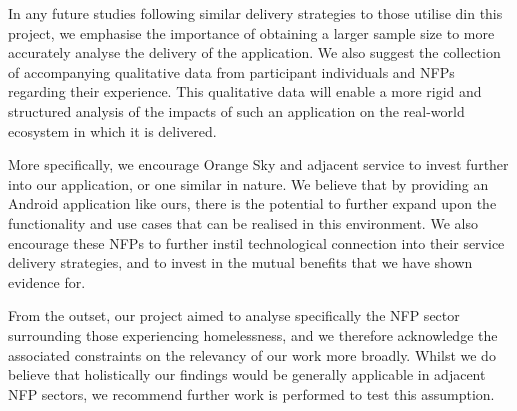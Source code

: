 In any future studies following similar delivery strategies to those utilise din this project, we emphasise the importance of obtaining a larger sample size to more accurately analyse the delivery of the application. We also suggest the collection of accompanying qualitative data from participant individuals and NFPs regarding their experience. This qualitative data will enable a more rigid and structured analysis of the impacts of such an application on the real-world ecosystem in which it is delivered.

More specifically, we encourage Orange Sky and adjacent service to invest further into our application, or one similar in nature. We believe that by providing an Android application like ours, there is the potential to further expand upon the functionality and use cases that can be realised in this environment. We also encourage these NFPs to further instil technological connection into their service delivery strategies, and to invest in the mutual benefits that we have shown evidence for.

From the outset, our project aimed to analyse specifically the NFP sector surrounding those experiencing homelessness, and we therefore acknowledge the associated constraints on the relevancy of our work more broadly. Whilst we do believe that holistically our findings would be generally applicable in adjacent NFP sectors, we recommend further work is performed to test this assumption.